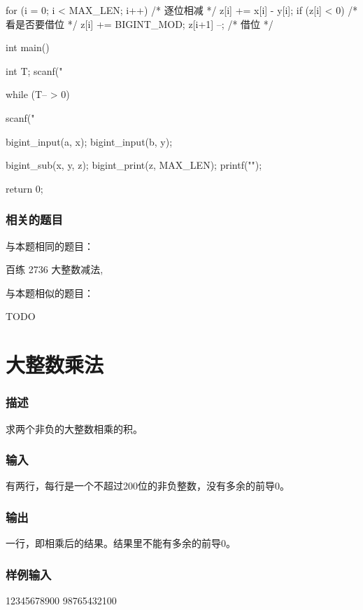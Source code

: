 \begin{Codex}[label=bigint_sub.c]
{    for (i = 0; i < MAX_LEN; i++) {  /* 逐位相减 */
        z[i] += x[i] - y[i];
        if (z[i] < 0) {  /* 看是否要借位 */
            z[i] += BIGINT_MOD;
            z[i+1] --;  /* 借位 */
        }
    }
}

int main() {
    int T;    
    scanf("%

    while (T-- > 0) {
        scanf("%

        bigint_input(a, x);
        bigint_input(b, y);

        bigint_sub(x, y, z);
        bigint_print(z, MAX_LEN);
        printf("\n"); 
    }
    return 0;
}
\end{Codex}

\subsubsection{相关的题目}
与本题相同的题目：
\begindot
\item 百练 2736 大整数减法, 
\myenddot

与本题相似的题目：
\begindot
\item  TODO
\myenddot


\section{大整数乘法} %
\label{sec:bigintmul}
\subsubsection{描述}
求两个非负的大整数相乘的积。

\subsubsection{输入}
有两行，每行是一个不超过200位的非负整数，没有多余的前导0。 

\subsubsection{输出}
一行，即相乘后的结果。结果里不能有多余的前导0。 

\subsubsection{样例输入}
\begin{Code}
12345678900
98765432100
\end{Code}

